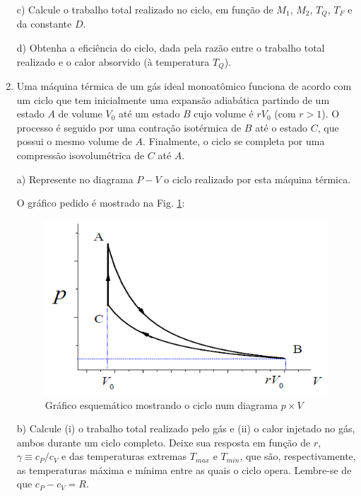 \begin{enumerate}[start=1,label={\bfseries Q\arabic*.}]
c) Calcule o trabalho total realizado no ciclo, em função de $M_{1}$, $M_{2}$, $T_{Q}$, $T_{F}$ e da constante $D$.

d) Obtenha a eficiência do ciclo, dada pela razão entre o trabalho total realizado e o calor absorvido (à temperatura $T_{Q}$).





\item Uma máquina térmica de um gás ideal monoatômico funciona de acordo com um ciclo que tem inicialmente uma expansão adiabática partindo de um estado $A$ de volume $V_{0}$ até um estado $B$ cujo volume é $rV_{0}$ (com $r > 1$). O processo é seguido por uma contração isotérmica de $B$ até o estado $C$, que possui o mesmo volume de $A$. Finalmente, o ciclo se completa por uma compressão isovolumétrica de $C$ até $A$.


 a) Represente no diagrama $P - V$ o ciclo realizado por esta máquina térmica.

 \resposta O gráfico pedido é mostrado na Fig. \ref{diagramapvpng}:
 \begin{figure}[H]
   \centering
   \includegraphics[scale=1]{termica-img/diagramapv.png}
   \caption{Gráfico esquemático mostrando o ciclo num diagrama $p \times V$}\label{diagramapvpng}
 \end{figure}


b) Calcule (i) o trabalho total realizado pelo gás e (ii) o calor injetado no gás, ambos durante um ciclo completo. Deixe sua resposta em função de $r$, $\gamma \equiv c_{P} /c_{V}$ e das temperaturas extremas $T_{max}$ e $T_{min}$, que são, respectivamente, as temperaturas máxima e mínima entre as quais o ciclo opera. Lembre-se de que $c_{P} - c_{V} = R$.


\end{enumerate}
